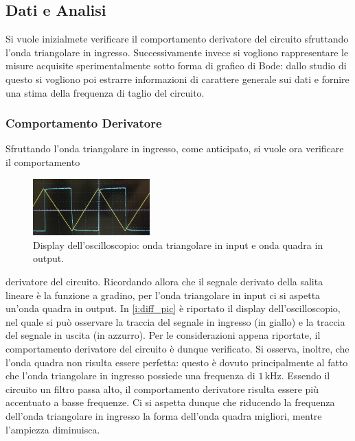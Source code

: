 \documentclass[a4paper,11pt]{article} %
\begin{document}
\subsection{Dati e Analisi}

Si vuole inizialmete verificare il comportamento derivatore del circuito sfruttando l'onda triangolare in ingresso.
Successivamente invece si vogliono rappresentare le misure acquisite sperimentalmente sotto forma di grafico di Bode:
dallo studio di questo si vogliono poi estrarre informazioni di carattere generale sui dati e fornire una stima della
frequenza di taglio del circuito.



\subsubsection{Comportamento Derivatore}

Sfruttando l'onda triangolare in ingresso, come anticipato, si vuole ora verificare il comportamento 

\begin{figure}
	\centering
	\includegraphics[width=0.4\textwidth]{../Plots/Report_Plots/diff_osc_pic.png}
	\caption{\small Display dell'oscilloscopio: onda triangolare in input e onda quadra in output.}
	\label{i:diff_pic}
\end{figure}

\noindent derivatore del circuito. Ricordando allora che il segnale derivato della salita lineare è la funzione a
gradino, per l'onda triangolare in input ci si aspetta un'onda quadra in output. In \autoref{i:diff_pic} è riportato il
display dell'oscilloscopio, nel quale si può osservare la traccia del segnale in ingresso (in giallo) e la traccia del
segnale in uscita (in azzurro). Per le considerazioni appena riportate, il comportamento derivatore del circuito è
dunque verificato. Si osserva, inoltre, che l'onda quadra non risulta essere perfetta: questo è dovuto principalmente al
fatto che l'onda triangolare in ingresso possiede una frequenza di $1\,\si{\kHz}$. Essendo il circuito un filtro passa
alto, il comportamento derivatore risulta essere più accentuato a basse frequenze. Ci si aspetta dunque che riducendo la
frequenza dell'onda triangolare in ingresso la forma dell'onda quadra migliori, mentre l'ampiezza diminuisca.
\end{document}
